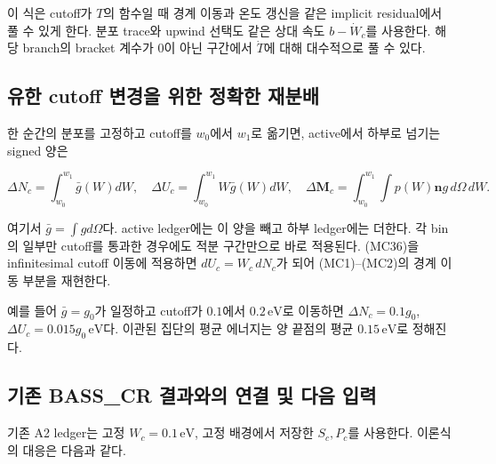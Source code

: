 \documentclass[11pt,a4paper]{article}
\begin{document}
이 식은 cutoff가 \(T\)의 함수일 때 경계 이동과 온도 갱신을 같은 implicit residual에서 풀 수 있게 한다. 분포 trace와 upwind 선택도 같은 상대 속도 \(b-\dot W_c\)를 사용한다. 해당 branch의 bracket 계수가 0이 아닌 구간에서 \(\dot T\)에 대해 대수적으로 풀 수 있다.

\hypertarget{uxc720uxd55c-cutoff-uxbcc0uxacbduxc744-uxc704uxd55c-uxc815uxd655uxd55c-uxc7acuxbd84uxbc30}{%
\subsection{유한 cutoff 변경을 위한 정확한 재분배}\label{uxc720uxd55c-cutoff-uxbcc0uxacbduxc744-uxc704uxd55c-uxc815uxd655uxd55c-uxc7acuxbd84uxbc30}}

한 순간의 분포를 고정하고 cutoff를 \(w_0\)에서 \(w_1\)로 옮기면, active에서 하부로 넘기는 signed 양은

\[
\Delta N_c=\int_{w_0}^{w_1}\bar g(W)dW,\quad
\Delta U_c=\int_{w_0}^{w_1}W\bar g(W)dW,
\quad
\Delta\boldsymbol M_c=\int_{w_0}^{w_1}\!\int p(W)\boldsymbol n g\,d\Omega\,dW.
\tag{MC36}
\]

여기서 \(\bar g=\int gd\Omega\)다. active ledger에는 이 양을 빼고 하부 ledger에는 더한다. 각 bin의 일부만 cutoff를 통과한 경우에도 적분 구간만으로 바로 적용된다. (MC36)을 infinitesimal cutoff 이동에 적용하면 \(dU_c=W_c\,dN_c\)가 되어 (MC1)--(MC2)의 경계 이동 부분을 재현한다.

예를 들어 \(\bar g=g_0\)가 일정하고 cutoff가 \(0.1\)에서 \(0.2\,\mathrm{eV}\)로 이동하면 \(\Delta N_c=0.1g_0\), \(\Delta U_c=0.015g_0\,\mathrm{eV}\)다. 이관된 집단의 평균 에너지는 양 끝점의 평균 \(0.15\,\mathrm{eV}\)로 정해진다.

\hypertarget{uxae30uxc874-bass_cr-uxacb0uxacfcuxc640uxc758-uxc5f0uxacb0-uxbc0f-uxb2e4uxc74c-uxc785uxb825}{%
\subsection{기존 BASS\_CR 결과와의 연결 및 다음 입력}\label{uxae30uxc874-bass_cr-uxacb0uxacfcuxc640uxc758-uxc5f0uxacb0-uxbc0f-uxb2e4uxc74c-uxc785uxb825}}

기존 A2 ledger는 고정 \(W_c=0.1\,\mathrm{eV}\), 고정 배경에서 저장한 \(S_c,P_c\)를 사용한다. 이론식의 대응은 다음과 같다.
\end{document}
